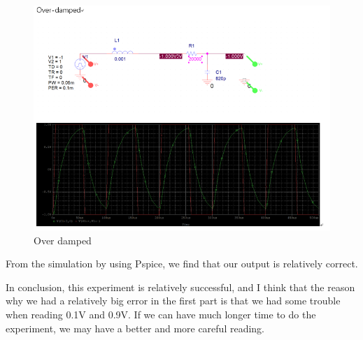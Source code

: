 \documentclass{article}
\begin{document}
\begin{figure}[H]
	\centering
	\includegraphics[width=0.7\linewidth]{p3}
	\caption{Over damped}
	\label{fig:p3}
\end{figure}

From the simulation by using Pspice, we find that our output is relatively correct.

In conclusion, this experiment is relatively successful, and I think that the reason why we had a relatively big error in the first part is that we had some trouble when reading 0.1V and 0.9V. If we can have much longer time to do the experiment, we may have a better and more careful reading.
\end{document}
